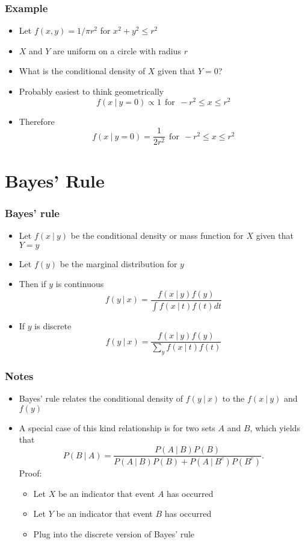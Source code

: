 \documentclass[aspectratio=169]{beamer}
\begin{document}
\begin{frame}\frametitle{Example}
\begin{itemize}
\item Let $f(x, y) = 1 / \pi r^2$ for $x^2 + y^2 \leq r^2$
\item $X$ and $Y$ are uniform on a circle with radius $r$
\item What is the conditional density of $X$ given that $Y=0$?
\item Probably easiest to think geometrically
$$
f(x ~|~ y = 0) \propto 1 ~~\mbox{for}~~ -r^2 \leq x \leq r^2
$$
\item Therefore
$$
f(x ~|~ y = 0) = \frac{1}{2r^2}~~\mbox{for}~~ -r^2 \leq x \leq r^2
$$
\end{itemize}
\end{frame}

\section{Bayes' Rule}
\begin{frame}\frametitle{Bayes' rule}
\begin{itemize}
\item Let $f(x ~|~ y)$ be the conditional density or mass function for $X$ given
  that $Y = y$
\item Let $f(y)$ be the marginal distribution for $y$
\item Then if $y$ is continuous
  $$
  f(y ~|~ x) = \frac{f(x ~|~ y) f(y)}{\int f(x ~|~ t) f(t) dt}
  $$
\item If $y$ is discrete
  $$
  f(y ~|~ x) = \frac{f(x ~|~ y) f(y)}{\sum_y f(x ~|~ t) f(t)}  
  $$
\end{itemize}
\end{frame}

\begin{frame}\frametitle{Notes}
\begin{itemize}
\item Bayes' rule relates the conditional density of $f(y ~|~ x)$ to
  the $f(x ~|~ y)$ and $f(y)$
\item A special case of this kind relationship is for two sets $A$ and $B$, 
  which yields that
  $$
  P(B ~|~ A) = \frac{P(A ~|~ B) P(B)}{P(A ~|~ B) P(B) + P(A ~|~ B^c)P(B^c)}.
  $$
Proof:
\begin{itemize}
\item Let $X$ be an indicator that event $A$ has occurred
\item Let $Y$ be an indicator that event $B$ has occurred
\item Plug into the discrete version of Bayes' rule
\end{itemize}
\end{itemize}
\end{frame}
\end{document}
